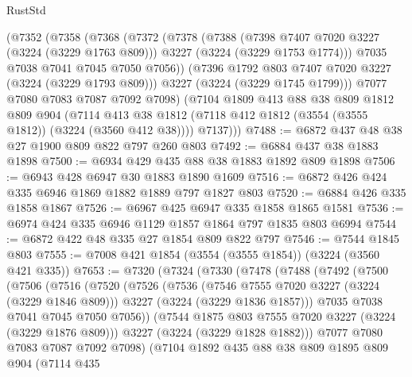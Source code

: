 \begin{lexlean}{RustStd}
\begin{coremodule}
      (@7352
        (@7358
          (@7368
            (@7372
              (@7378
                (@7388
                  (@7398 @7407 @7020 @3227 (@3224 (@3229 @1763 @809)))
                  @3227
                  (@3224 (@3229 @1753 @1774)))
                @7035
                @7038
                @7041
                @7045
                @7050
                @7056))
            (@7396 @1792 @803 @7407 @7020 @3227 (@3224 (@3229 @1793 @809)))
            @3227
            (@3224 (@3229 @1745 @1799)))
          @7077
          @7080
          @7083
          @7087
          @7092
          @7098)
        (@7104
          @1809
          @413
          @88
          @38
          @809
          @1812
          @809
          @904
          (@7114 @413 @38 @1812 (@7118 @412 @1812 (@3554 (@3555 @1812)) (@3224 (@3560 @412 @38))))
          @7137)))
@7488 := @6872 @437 @48 @38 @27 @1900 @809 @822 @797 @260 @803
@7492 := @6884 @437 @38 @1883 @1898
@7500 := @6934 @429 @435 @88 @38 @1883 @1892 @809 @1898
@7506 := @6943 @428 @6947 @30 @1883 @1890 @1609
@7516 := @6872 @426 @424 @335 @6946 @1869 @1882 @1889 @797 @1827 @803
@7520 := @6884 @426 @335 @1858 @1867
@7526 := @6967 @425 @6947 @335 @1858 @1865 @1581
@7536 := @6974 @424 @335 @6946 @1129 @1857 @1864 @797 @1835 @803 @6994
@7544 := @6872 @422 @48 @335 @27 @1854 @809 @822 @797
@7546 := @7544 @1845 @803
@7555 := @7008 @421 @1854 (@3554 (@3555 @1854)) (@3224 (@3560 @421 @335))
@7653 := @7320
    (@7324
      (@7330
        (@7478
          (@7488
            (@7492
              (@7500
                (@7506
                  (@7516
                    (@7520
                      (@7526
                        (@7536
                          (@7546 @7555 @7020 @3227 (@3224 (@3229 @1846 @809)))
                          @3227
                          (@3224 (@3229 @1836 @1857)))
                        @7035
                        @7038
                        @7041
                        @7045
                        @7050
                        @7056))
                    (@7544 @1875 @803 @7555 @7020 @3227 (@3224 (@3229 @1876 @809)))
                    @3227
                    (@3224 (@3229 @1828 @1882)))
                  @7077
                  @7080
                  @7083
                  @7087
                  @7092
                  @7098)
                (@7104
                  @1892
                  @435
                  @88
                  @38
                  @809
                  @1895
                  @809
                  @904
                  (@7114
                    @435

\end{coremodule}
\end{lexlean}
